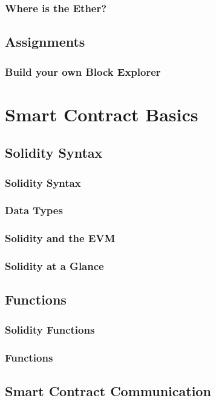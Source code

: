 \documentclass[a4paper, oneside]{book}
\begin{document}
\subsection{Where is the Ether?}

\section{Assignments}
\subsection{Build your own Block Explorer}


\chapter{Smart Contract Basics}

\section{Solidity Syntax}
\subsection{Solidity Syntax}
\subsection{Data Types}
\subsection{Solidity and the EVM}
\subsection{Solidity at a Glance}

\section{Functions}
\subsection{Solidity Functions}
\subsection{Functions}

\section{Smart Contract Communication}
\end{document}
